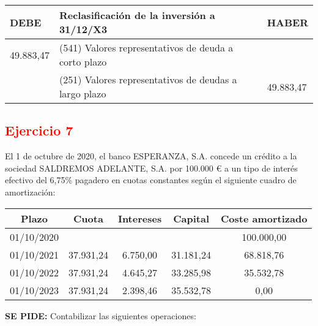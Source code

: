 \begin{enumerate}[label=\alph*)]
\begin{figure}[H]
\begin{tikzpicture}
        \end{tikzpicture}
    \end{figure}

    \begin{table}[H]
        \centering
        \begin{tabular}{|p{3cm}|p{6cm}|p{3cm}|}
        \hline
        \rowcolor{blue!30}
        \textbf{DEBE} & \textbf{Reclasificación de la inversión a 31/12/X3} & \textbf{HABER} \\
        \hline
        49.883,47 & (541) Valores representativos de deuda a corto plazo & \\
        \hline
        & (251) Valores representativos de deudas a largo plazo & 49.883,47 \\
        \hline
        \end{tabular}
    \end{table}

\end{enumerate}


    \newpage 
    \subsection*{\textcolor{red}{\textbf{Ejercicio 7}}}

    El 1 de octubre de 2020, el banco ESPERANZA, S.A. concede un crédito a la sociedad SALDREMOS ADELANTE, S.A. por 100.000 € a un tipo de interés efectivo del 6,75\% pagadero en cuotas constantes según el siguiente cuadro de amortización:

    \begin{table}[H]
    \centering
    \begin{tabular}{|c|c|c|c|c|}
        \hline
        Plazo & Cuota & Intereses & Capital & Coste amortizado \\
        \hline
        01/10/2020 & & & & 100.000,00 \\
        \hline
        01/10/2021 & 37.931,24 & 6.750,00 & 31.181,24 & 68.818,76 \\
        \hline
        01/10/2022 & 37.931,24 & 4.645,27 & 33.285,98 & 35.532,78 \\
        \hline
        01/10/2023 & 37.931,24 & 2.398,46 & 35.532,78 & 0,00 \\
        \hline
    \end{tabular}
    \end{table}

    \textbf{SE PIDE:} Contabilizar las siguientes operaciones:

